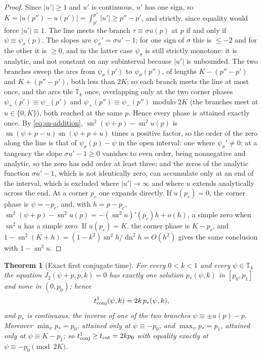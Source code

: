 \documentclass[11pt]{article}
\newtheorem{theorem}{Theorem}[section]
\theoremstyle{remark}
\newcommand{\sn}{\operatorname{sn}}
\newcommand{\dn}{\operatorname{dn}}
\newcommand{\Torus}{\mathbb T}
\begin{document}
\begin{proof}
Since $|u'|\ge1$ and $u'$ is continuous, $u'$ has one sign, so
$K=|u(p'')-u(p')|=\int_{p'}^{p''}|u'|\ge p''-p'$, and strictly, since
equality would force $|u'|\equiv1$.  The line meets the branch
$\tau\equiv\sigma u(p)$ at $p$ if and only if $\psi\equiv\psi_\sigma(p)$.
The slopes are $\psi_\sigma'=\sigma u'-1$; for one sign of $\sigma$ this is
$\le-2$ and for the other it is $\ge0$, and in the latter case
$\psi_\sigma$ is still strictly monotone: it is analytic, and not constant
on any subinterval because $|u'|$ is unbounded.  The two branches sweep the
arcs from $\psi_\sigma(p')$ to $\psi_\sigma(p'')$, of lengths $K-(p''-p')$
and $K+(p''-p')$, both less than $2K$; so each branch meets the line at most
once, and the arcs tile $\Torus_k$ once, overlapping only at the two corner
phases $\psi_+(p')\equiv\psi_-(p')$ and $\psi_+(p'')\equiv\psi_-(p'')$ modulo $2K$ (the branches
meet at $u\in\{0,K\}$), both reached at the same $p$.  Hence every phase
is attained exactly once.  By
\eqref{eq:sn-addition}, $\sn^2(\psi+p)-\sn^2u(p)$ is
$\sn(\psi+p-u)\sn(\psi+p+u)$ times a positive factor, so the order of the
zero along the line is that of $\psi_\sigma(p)-\psi$ in the open
interval: one where
$\psi_\sigma'\ne0$; at a tangency the slope $\sigma u'-1\ge0$ vanishes to
even order, being nonnegative and analytic, so the zero has odd order at
least three; and the zeros of the analytic function $\sigma u'-1$, which is
not identically zero, can accumulate only at an end of the interval, which is
excluded where $|u'|\to\infty$ and where $u$ extends analytically across
the end.  At a corner $p_c$ one expands directly.  If $u(p_c)=0$, the
corner phase is $\psi=-p_c$, and, with $h=p-p_c$,
$\sn^2(\psi+p)-\sn^2u(p)=-(\sn^2u)'(p_c)h+o(h)$,
a simple zero when $\sn^2u$ has a simple zero.
If $u(p_c)=K$, the corner phase is $K-p_c$, and
$1-\sn^2(K+h)=(1-k^2)\sn^2h/\dn^2h=O(h^2)$ gives
the same conclusion with $1-\sn^2u$.
\end{proof}

\begin{theorem}[Exact first conjugate time]\label{thm:first}
For every $0<k<1$ and every $\psi\in\Torus_k$ the equation
$J_2(\psi+p,p,k)=0$ has exactly one solution $p_*(\psi,k)$ in $[p_0,p_1]$
and none in $(0,p_0)$; hence
\begin{equation}\label{eq:exact-time}
 t^1_{\rm conj}(\psi,k)=2k\,p_*(\psi,k),
\end{equation}
and $p_*$ is continuous, the inverse of one of the two branches
$\psi\equiv\pm u(p)-p$.  Moreover $\min_\psi p_*=p_0$, attained only at
$\psi\equiv-p_0$, and $\max_\psi p_*=p_1$, attained only at
$\psi\equiv K-p_1$; so $t^1_{\rm conj}\ge t_{\rm cut}=2kp_0$ with equality
exactly at $\psi\equiv-p_0\pmod{2K}$.
\end{theorem}
\end{document}
